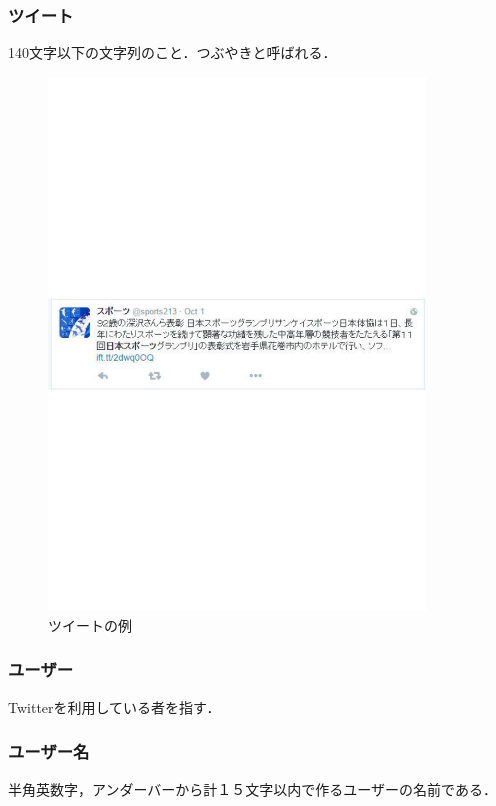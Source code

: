 \subsubsection*{ツイート}
140文字以下の文字列のこと．つぶやきと呼ばれる．
\begin{figure}[htb]
\centering
\includegraphics[width=10cm]{tuito.pdf}
\caption{ツイートの例}\label{ace}
\end{figure}

\subsubsection*{ユーザー}
Twitterを利用している者を指す．
　
\subsubsection*{ユーザー名}
半角英数字，アンダーバーから計１５文字以内で作るユーザーの名前である．


